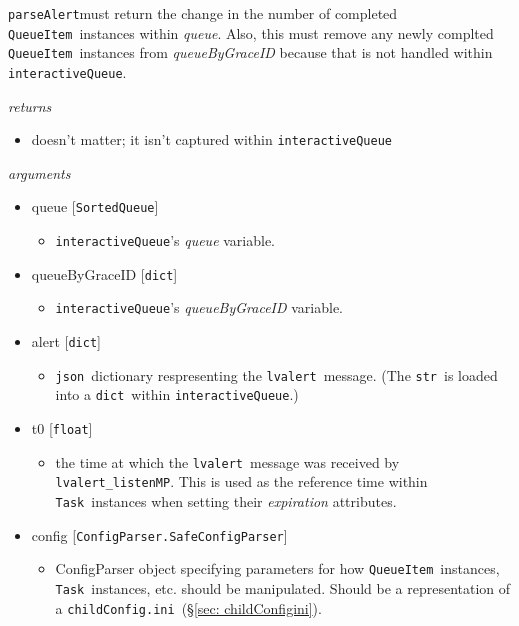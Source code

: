 \documentclass{article}
\newcommand{\alert}{\texttt{lvalert}}
\newcommand{\lvalertListenMP}{\texttt{lvalert\_listenMP}}
\newcommand{\interactiveQueue}{\texttt{interactiveQueue}}
\newcommand{\parseAlert}{\texttt{parseAlert}}
\newcommand{\SortedQueue}{\texttt{SortedQueue}}
\newcommand{\QueueItem}{\texttt{QueueItem}}
\newcommand{\Task}{\texttt{Task}}
\newcommand{\childConfigini}{\texttt{childConfig.ini}}
\newcommand{\pythonfloat}{\texttt{float}}
\newcommand{\pythonstr}{\texttt{str}}
\newcommand{\pythondict}{\texttt{dict}}
\newcommand{\json}{\texttt{json}}
\begin{document}
\parseAlert must return the change in the number of completed \QueueItem~instances within \textit{queue}.
Also, this must remove any newly complted \QueueItem~instances from \textit{queueByGraceID} because that is not handled within \interactiveQueue.

\vspace{0.5cm}
\noindent
\textit{returns}

\begin{itemize}
    \item{doesn't matter; it isn't captured within \interactiveQueue}
\end{itemize}

\noindent
\textit{arguments}

\begin{itemize} 
    \item{queue [\SortedQueue]
        \begin{itemize}
            \item{\interactiveQueue's \textit{queue} variable.}
        \end{itemize}
         }
    \item{queueByGraceID [\pythondict]
        \begin{itemize}
            \item{\interactiveQueue's \textit{queueByGraceID} variable.}
        \end{itemize}
         }
    \item{alert [\pythondict]
        \begin{itemize}
            \item{\json~dictionary respresenting the \alert~message. (The \pythonstr~is loaded into a \pythondict~within \interactiveQueue.)}
        \end{itemize}
         }
    \item{t0 [\pythonfloat]
        \begin{itemize}
            \item{the time at which the \alert~message was received by \lvalertListenMP. This is used as the reference time within \Task~instances when setting their \textit{expiration} attributes.}
        \end{itemize}
         }
    \item{config [\texttt{ConfigParser.SafeConfigParser}]
        \begin{itemize}
            \item{ConfigParser object specifying parameters for how \QueueItem~instances, \Task~instances, etc. should be manipulated. Should be a representation of a \childConfigini~(\S\ref{sec: childConfigini}).}
        \end{itemize}
         }
\end{itemize}
\end{document}
